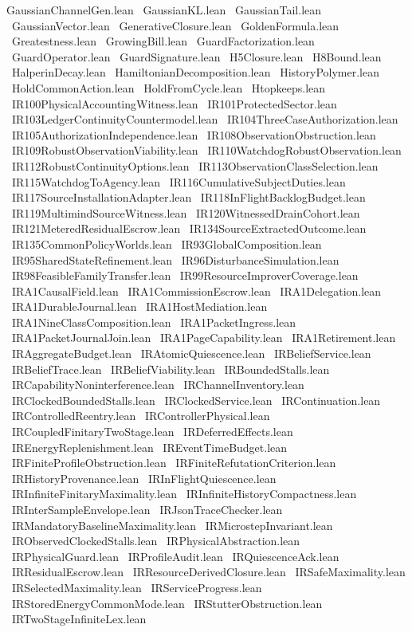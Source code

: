 GaussianChannelGen.lean \
GaussianKL.lean \
GaussianTail.lean \
GaussianVector.lean \
GenerativeClosure.lean \
GoldenFormula.lean \
Greatestness.lean \
GrowingBill.lean \
GuardFactorization.lean \
GuardOperator.lean \
GuardSignature.lean \
H5Closure.lean \
H8Bound.lean \
HalperinDecay.lean \
HamiltonianDecomposition.lean \
HistoryPolymer.lean \
HoldCommonAction.lean \
HoldFromCycle.lean \
Htopkeeps.lean \
IR100PhysicalAccountingWitness.lean \
IR101ProtectedSector.lean \
IR103LedgerContinuityCountermodel.lean \
IR104ThreeCaseAuthorization.lean \
IR105AuthorizationIndependence.lean \
IR108ObservationObstruction.lean \
IR109RobustObservationViability.lean \
IR110WatchdogRobustObservation.lean \
IR112RobustContinuityOptions.lean \
IR113ObservationClassSelection.lean \
IR115WatchdogToAgency.lean \
IR116CumulativeSubjectDuties.lean \
IR117SourceInstallationAdapter.lean \
IR118InFlightBacklogBudget.lean \
IR119MultimindSourceWitness.lean \
IR120WitnessedDrainCohort.lean \
IR121MeteredResidualEscrow.lean \
IR134SourceExtractedOutcome.lean \
IR135CommonPolicyWorlds.lean \
IR93GlobalComposition.lean \
IR95SharedStateRefinement.lean \
IR96DisturbanceSimulation.lean \
IR98FeasibleFamilyTransfer.lean \
IR99ResourceImproverCoverage.lean \
IRA1CausalField.lean \
IRA1CommissionEscrow.lean \
IRA1Delegation.lean \
IRA1DurableJournal.lean \
IRA1HostMediation.lean \
IRA1NineClassComposition.lean \
IRA1PacketIngress.lean \
IRA1PacketJournalJoin.lean \
IRA1PageCapability.lean \
IRA1Retirement.lean \
IRAggregateBudget.lean \
IRAtomicQuiescence.lean \
IRBeliefService.lean \
IRBeliefTrace.lean \
IRBeliefViability.lean \
IRBoundedStalls.lean \
IRCapabilityNoninterference.lean \
IRChannelInventory.lean \
IRClockedBoundedStalls.lean \
IRClockedService.lean \
IRContinuation.lean \
IRControlledReentry.lean \
IRControllerPhysical.lean \
IRCoupledFinitaryTwoStage.lean \
IRDeferredEffects.lean \
IREnergyReplenishment.lean \
IREventTimeBudget.lean \
IRFiniteProfileObstruction.lean \
IRFiniteRefutationCriterion.lean \
IRHistoryProvenance.lean \
IRInFlightQuiescence.lean \
IRInfiniteFinitaryMaximality.lean \
IRInfiniteHistoryCompactness.lean \
IRInterSampleEnvelope.lean \
IRJsonTraceChecker.lean \
IRMandatoryBaselineMaximality.lean \
IRMicrostepInvariant.lean \
IRObservedClockedStalls.lean \
IRPhysicalAbstraction.lean \
IRPhysicalGuard.lean \
IRProfileAudit.lean \
IRQuiescenceAck.lean \
IRResidualEscrow.lean \
IRResourceDerivedClosure.lean \
IRSafeMaximality.lean \
IRSelectedMaximality.lean \
IRServiceProgress.lean \
IRStoredEnergyCommonMode.lean \
IRStutterObstruction.lean \
IRTwoStageInfiniteLex.lean \
